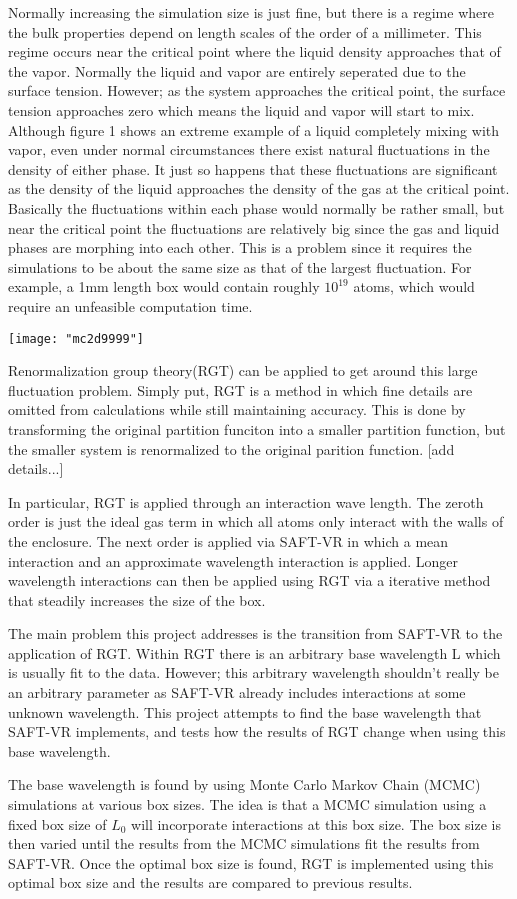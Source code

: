Normally increasing the simulation size is just fine, but there is a regime where the bulk properties depend on length scales of the order of a millimeter. This regime occurs near the critical point where the liquid density approaches that of the vapor. Normally the liquid and vapor are entirely seperated due to the surface tension. However; as the system approaches the critical point, the surface tension approaches zero which means the liquid and vapor will start to mix. Although figure 1 shows an extreme example of a liquid completely mixing with vapor, even under normal circumstances there exist natural fluctuations in the density of either phase. It just so happens that these fluctuations are significant as the density of the liquid approaches the density of the gas at the critical point. Basically the fluctuations within each phase would normally be rather small, but near the critical point the fluctuations are relatively big since the gas and liquid phases are morphing into each other. This is a problem since it requires the simulations to be about the same size as that of the largest fluctuation. For example, a 1mm length box would contain roughly $10^{19}$ atoms, which would require an unfeasible computation time.

\texttt{[image: "mc2d9999"]}

Renormalization group theory(RGT) can be applied to get around this large fluctuation problem. Simply put, RGT is a method in which fine details are omitted from calculations while still maintaining accuracy. This is done by transforming the original partition funciton into a smaller partition function, but the smaller system is renormalized to the original parition function. [add details...]

In particular, RGT is applied through an interaction wave length. The zeroth order is just the ideal gas term in which all atoms only interact with the walls of the enclosure. The next order is applied via SAFT-VR in which a mean interaction and an approximate wavelength interaction is applied. Longer wavelength interactions can then be applied using RGT via a iterative method that steadily increases the size of the box.

The main problem this project addresses is the transition from SAFT-VR to the application of RGT. Within RGT there is an arbitrary base wavelength L which is usually fit to the data. However; this arbitrary wavelength shouldn't really be an arbitrary parameter as SAFT-VR already includes interactions at some unknown wavelength. This project attempts to find the base wavelength that SAFT-VR implements, and tests how the results of RGT change when using this base wavelength.

The base wavelength is found by using Monte Carlo Markov Chain (MCMC) simulations at various box sizes. The idea is that a MCMC simulation using a fixed box size of $L_0$ will incorporate interactions at this box size. The box size is then varied until the results from the MCMC simulations fit the results from SAFT-VR. Once the optimal box size is found, RGT is implemented using this optimal box size and the results are compared to previous results.

